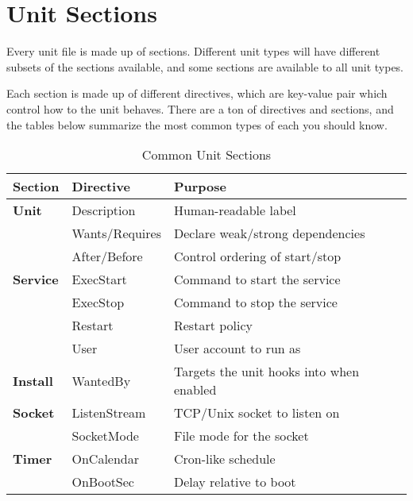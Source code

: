 \documentclass[openany, 12pt]{book}
\begin{document}
\chapter{Unit Sections}
Every unit file is made up of sections. Different unit types will have different
subsets of the sections available, and some sections are available to all unit
types.

Each section is made up of different directives, which are key-value pair which
control how to the unit behaves. There are a ton of directives and sections, and
the tables below summarize the most common types of each you should know.



\begin{table}
  \begin{center}
    \begin{tabular}{lll}
      \toprule
      \textbf{Section} & \textbf{Directive} & \textbf{Purpose}                         \\
      \midrule
      \textbf{Unit}
                       & Description        & Human-readable label                     \\
                       & Wants/Requires     & Declare weak/strong dependencies         \\
                       & After/Before       & Control ordering of start/stop           \\
      \midrule
      \textbf{Service}
                       & ExecStart          & Command to start the service             \\
                       & ExecStop           & Command to stop the service              \\
                       & Restart            & Restart policy                           \\
                       & User               & User account to run as                   \\
      \midrule
      \textbf{Install}
                       & WantedBy           & Targets the unit hooks into when enabled \\
      \midrule
      \textbf{Socket}
                       & ListenStream       & TCP/Unix socket to listen on             \\
                       & SocketMode         & File mode for the socket                 \\
      \midrule
      \textbf{Timer}
                       & OnCalendar         & Cron-like schedule                       \\
                       & OnBootSec          & Delay relative to boot                   \\
      \bottomrule
    \end{tabular}
  \end{center}
  \caption{Common Unit Sections}
\end{table}
\end{document}
